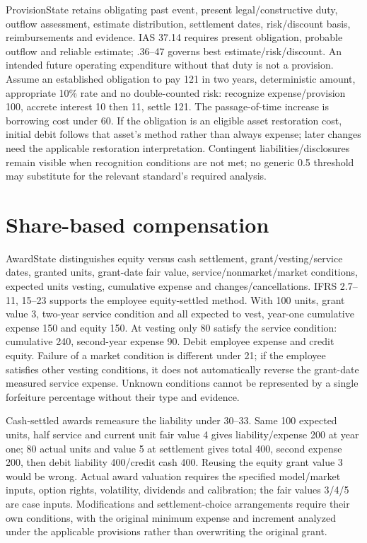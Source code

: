 ProvisionState retains obligating past event, present legal/constructive duty, outflow assessment, estimate distribution, settlement dates, risk/discount basis, reimbursements and evidence. IAS 37.14 requires present obligation, probable outflow and reliable estimate; .36--47 governs best estimate/risk/discount. An intended future operating expenditure without that duty is not a provision. Assume an established obligation to pay 121 in two years, deterministic amount, appropriate 10\% rate and no double-counted risk: recognize expense/provision 100, accrete interest 10 then 11, settle 121. The passage-of-time increase is borrowing cost under 60. If the obligation is an eligible asset restoration cost, initial debit follows that asset's method rather than always expense; later changes need the applicable restoration interpretation. Contingent liabilities/disclosures remain visible when recognition conditions are not met; no generic 0.5 threshold may substitute for the relevant standard's required analysis.

\hypertarget{share-based-compensation}{%
\section{Share-based compensation}\label{method-corporate-extensions-share-based-compensation}}

AwardState distinguishes equity versus cash settlement, grant/vesting/service dates, granted units, grant-date fair value, service/nonmarket/market conditions, expected units vesting, cumulative expense and changes/cancellations. IFRS 2.7--11, 15--23 supports the employee equity-settled method. With 100 units, grant value 3, two-year service condition and all expected to vest, year-one cumulative expense 150 and equity 150. At vesting only 80 satisfy the service condition: cumulative 240, second-year expense 90. Debit employee expense and credit equity. Failure of a market condition is different under 21; if the employee satisfies other vesting conditions, it does not automatically reverse the grant-date measured service expense. Unknown conditions cannot be represented by a single forfeiture percentage without their type and evidence.

Cash-settled awards remeasure the liability under 30--33. Same 100 expected units, half service and current unit fair value 4 gives liability/expense 200 at year one; 80 actual units and value 5 at settlement gives total 400, second expense 200, then debit liability 400/credit cash 400. Reusing the equity grant value 3 would be wrong. Actual award valuation requires the specified model/market inputs, option rights, volatility, dividends and calibration; the fair values 3/4/5 are case inputs. Modifications and settlement-choice arrangements require their own conditions, with the original minimum expense and increment analyzed under the applicable provisions rather than overwriting the original grant.

